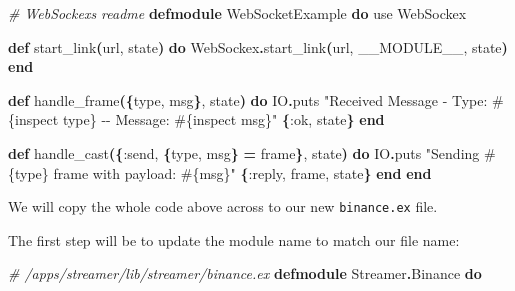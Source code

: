 \documentclass[
  oneside]{book}
\newenvironment{Shaded}{\begin{snugshade}}{\end{snugshade}}
\newcommand{\CommentTok}[1]{\textcolor[rgb]{0.56,0.35,0.01}{\textit{#1}}}
\newcommand{\ConstantTok}[1]{\textcolor[rgb]{0.56,0.35,0.01}{#1}}
\newcommand{\FunctionTok}[1]{\textcolor[rgb]{0.13,0.29,0.53}{\textbf{#1}}}
\newcommand{\ImportTok}[1]{#1}
\newcommand{\KeywordTok}[1]{\textcolor[rgb]{0.13,0.29,0.53}{\textbf{#1}}}
\newcommand{\NormalTok}[1]{#1}
\newcommand{\OperatorTok}[1]{\textcolor[rgb]{0.81,0.36,0.00}{\textbf{#1}}}
\newcommand{\OtherTok}[1]{\textcolor[rgb]{0.56,0.35,0.01}{#1}}
\newcommand{\StringTok}[1]{\textcolor[rgb]{0.31,0.60,0.02}{#1}}
\newcommand{\VariableTok}[1]{\textcolor[rgb]{0.00,0.00,0.00}{#1}}
\begin{document}
\begin{Shaded}
\begin{Highlighting}[]
\CommentTok{\# WebSockex\textquotesingle{}s readme}
\KeywordTok{defmodule} \ConstantTok{WebSocketExample} \KeywordTok{do}
  \ImportTok{use} \ConstantTok{WebSockex}

  \KeywordTok{def}\NormalTok{ start\_link}\FunctionTok{(}\NormalTok{url, state}\FunctionTok{)} \KeywordTok{do}
    \ConstantTok{WebSockex}\OperatorTok{.}\NormalTok{start\_link}\FunctionTok{(}\NormalTok{url, }\ConstantTok{\_\_MODULE\_\_}\NormalTok{, state}\FunctionTok{)}
  \KeywordTok{end}

  \KeywordTok{def}\NormalTok{ handle\_frame}\FunctionTok{(\{}\NormalTok{type, msg}\FunctionTok{\}}\NormalTok{, state}\FunctionTok{)} \KeywordTok{do}
    \ConstantTok{IO}\OperatorTok{.}\NormalTok{puts }\StringTok{"Received Message {-} Type: }\OtherTok{\#\{}\NormalTok{inspect type}\OtherTok{\}}\StringTok{ {-}{-} Message: }\OtherTok{\#\{}\NormalTok{inspect msg}\OtherTok{\}}\StringTok{"}
    \FunctionTok{\{}\VariableTok{:ok}\NormalTok{, state}\FunctionTok{\}}
  \KeywordTok{end}

  \KeywordTok{def}\NormalTok{ handle\_cast}\FunctionTok{(\{}\VariableTok{:send}\NormalTok{, }\FunctionTok{\{}\NormalTok{type, msg}\FunctionTok{\}} \OperatorTok{=}\NormalTok{ frame}\FunctionTok{\}}\NormalTok{, state}\FunctionTok{)} \KeywordTok{do}
    \ConstantTok{IO}\OperatorTok{.}\NormalTok{puts }\StringTok{"Sending }\OtherTok{\#\{}\NormalTok{type}\OtherTok{\}}\StringTok{ frame with payload: }\OtherTok{\#\{}\NormalTok{msg}\OtherTok{\}}\StringTok{"}
    \FunctionTok{\{}\VariableTok{:reply}\NormalTok{, frame, state}\FunctionTok{\}}
  \KeywordTok{end}
\KeywordTok{end}
\end{Highlighting}
\end{Shaded}

We will copy the whole code above across to our new \texttt{binance.ex} file.

\newpage

The first step will be to update the module name to match our file name:

\begin{Shaded}
\begin{Highlighting}[]
\CommentTok{\# /apps/streamer/lib/streamer/binance.ex}
\KeywordTok{defmodule} \ConstantTok{Streamer}\OperatorTok{.}\ConstantTok{Binance} \KeywordTok{do}
\end{Highlighting}
\end{Shaded}
\end{document}
